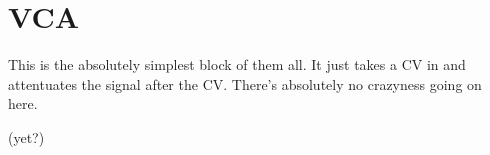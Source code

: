 \documentclass[12pt]{article}
\begin{document}
\section*{VCA}

This is the absolutely simplest block of them all. It just takes a CV in and attentuates the signal after the CV.
There's absolutely no crazyness going on here.

\bigskip

(yet?)
\end{document}
